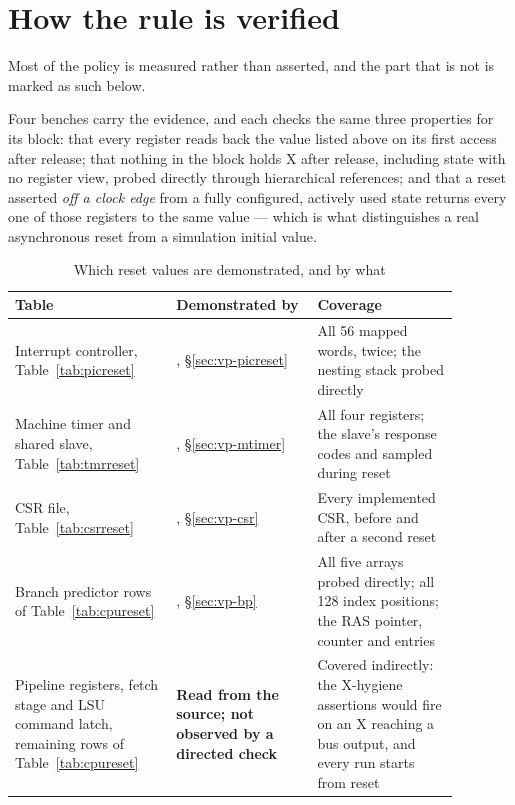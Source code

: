 \section{How the rule is verified}

Most of the policy is measured rather than asserted, and the part that is not
is marked as such below.

Four benches carry the evidence, and each checks the same three properties for
its block: that every register reads back the value listed above on its first
access after release; that nothing in the block holds X after release, including
state with no register view, probed directly through hierarchical references;
and that a reset asserted \emph{off a clock edge} from a fully configured,
actively used state returns every one of those registers to the same value ---
which is what distinguishes a real asynchronous reset from a simulation initial
value.

\begin{table}[H]
\centering
\caption{Which reset values are demonstrated, and by what}
\label{tab:resetevidence}
\begin{tabular}{@{}L{0.32\linewidth}L{0.28\linewidth}L{0.28\linewidth}@{}}
\toprule
\textbf{Table} & \textbf{Demonstrated by} & \textbf{Coverage} \\
\midrule
Interrupt controller, Table~\ref{tab:picreset} &
  , \S\ref{sec:vp-picreset} &
  All 56 mapped words, twice; the nesting stack probed directly \\
Machine timer and shared slave, Table~\ref{tab:tmrreset} &
  , \S\ref{sec:vp-mtimer} &
  All four registers; the slave's response codes and  sampled during
  reset \\
CSR file, Table~\ref{tab:csrreset} &
  , \S\ref{sec:vp-csr} &
  Every implemented CSR, before and after a second reset \\
Branch predictor rows of Table~\ref{tab:cpureset} &
  , \S\ref{sec:vp-bp} &
  All five arrays probed directly; all 128 index positions; the RAS pointer,
  counter and entries \\
\midrule
Pipeline registers, fetch stage and LSU command latch, remaining rows of
  Table~\ref{tab:cpureset} &
  \textbf{Read from the source; not observed by a directed check} &
  Covered indirectly: the X-hygiene assertions would fire on an X reaching a bus
  output, and every run starts from reset \\
\bottomrule
\end{tabular}
\end{table}

